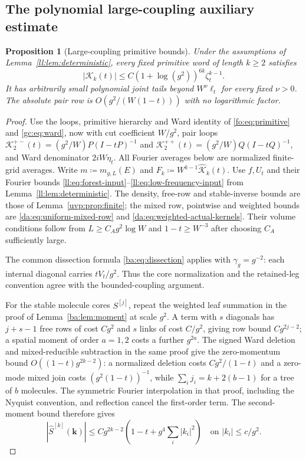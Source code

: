 \documentclass[11pt]{article}
\numberwithin{equation}{section}
\newtheorem{proposition}[theorem]{Proposition}
\theoremstyle{remark}
\newcommand{\cK}{\mathcal K}
\begin{document}
\subsection{The polynomial large-coupling auxiliary estimate}\label{app:polynomial-primitives}
\begin{proposition}[Large-coupling primitive bounds]\label{ll:prop:primitive}
Under the assumptions of Lemma~\ref{ll:lem:deterministic}, every fixed primitive word of length
$k\ge2$ satisfies
\[
 |\cK_k(t)|\le C(1+\log(g^2))^{6k}\zeta_t^{k-1}.
\]
It has arbitrarily small polynomial joint tails beyond
$W^\nu\ell_t$ for every fixed $\nu>0$. The absolute pair row is
$O(g^2/(W(1-t)))$ with no logarithmic factor.
\end{proposition}
\begin{proof}
Use the loops, primitive hierarchy and Ward identity of
\eqref{fo:eq:primitive} and \eqref{gc:eq:ward}, now with cut coefficient
\(W/g^2\), pair loops \(\cK_2^{+-}(t)=(g^2/W)P(I-tP)^{-1}\) and
\(\cK_2^{++}(t)=(g^2/W)Q(I-tQ)^{-1}\), and Ward denominator \(2iW\eta_t\).
All Fourier averages below are normalized finite-grid averages. Write
$m\coloneqq m_{g,L}(E)$ and $F_k\coloneqq W^{k-1}\widehat{\cK}_k(t)$.
Use $f,U_t$ and their Fourier bounds
\eqref{ll:eq:forest-input}--\eqref{ll:eq:low-frequency-input} from
Lemma~\ref{ll:lem:deterministic}.
The density, free-row and stable-inverse bounds are those of
Lemma~\ref{uvp:prop:finite}; the mixed row, pointwise
and weighted bounds are \eqref{da:eq:uniform-mixed-row} and
\eqref{da:eq:weighted-actual-kernels}. Their volume conditions follow
from $L\ge C_Ag^2\log W$ and $1-t\ge W^{-3}$ after choosing $C_A$
sufficiently large.

The common dissection formula \eqref{ba:eq:dissection} applies with
$\gamma_g=g^{-2}$: each internal diagonal carries $tV_t/g^2$.
Thus the core normalization and the retained-leg convention agree
with the bounded-coupling argument.

For the stable molecule cores $S^{[j]}$, repeat the weighted leaf
summation in the proof of Lemma~\ref{ba:lem:moment} at scale $g^2$.
A term with $s$ diagonals has $j+s-1$ free rows of cost $Cg^2$
and $s$ links of cost $C/g^2$, giving row bound $Cg^{2j-2}$;
a spatial moment of order $a=1,2$ costs a further $g^{2a}$.
The signed Ward deletion and mixed-reducible subtraction in the
same proof give the zero-momentum bound $O((1-t)g^{2k-2})$:
a normalized deletion costs $Cg^2/(1-t)$ and a zero-mode mixed join
costs $(g^2(1-t))^{-1}$, while $\sum_i j_i=k+2(b-1)$ for a tree
of $b$ molecules. The symmetric Fourier interpolation in that proof,
including the Nyquist convention, and reflection cancel the
first-order term. The second-moment bound therefore gives
\begin{equation}\label{ll:eq:alternating}
 |\widehat S^{[k]}(\boldsymbol k)|
 \le Cg^{2k-2}\left(1-t+g^{4}\sum_i|k_i|^2\right)
 \quad\text{on }|k_i|\le c/g^2.
\end{equation}


\end{proof}
\end{document}
